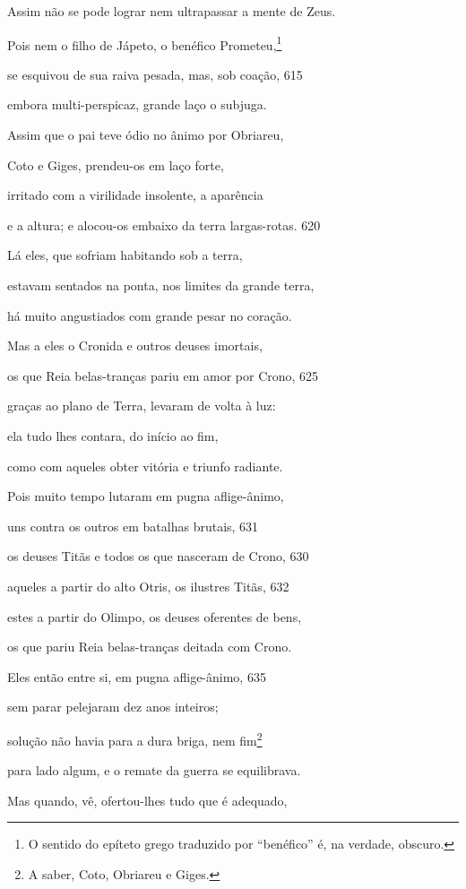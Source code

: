 \quad{}Assim não se pode lograr nem ultrapassar a mente de Zeus.

Pois nem o filho de Jápeto, o benéfico Prometeu,\footnote{O sentido do epíteto grego traduzido por ``benéfico'' é, na verdade, obscuro.}

se esquivou de sua raiva pesada, mas, sob coação, \num{615}

embora multi-perspicaz, grande laço o subjuga.

\medskip

Assim que o pai teve ódio no ânimo por Obriareu,

Coto e Giges, prendeu-os em laço forte,

irritado com a virilidade insolente, a aparência

e a altura; e alocou-os embaixo da terra largas-rotas. \num{620}

Lá eles, que sofriam habitando sob a terra,

estavam sentados na ponta, nos limites da grande terra,

há muito angustiados com grande pesar no coração.

Mas a eles o Cronida e outros deuses imortais,

os que Reia belas-tranças pariu em amor por Crono, \num{625}

graças ao plano de Terra, levaram de volta à luz:

ela tudo lhes contara, do início ao fim,

como com aqueles obter vitória e triunfo radiante.

Pois muito tempo lutaram em pugna aflige-ânimo,

uns contra os outros em batalhas brutais, \num{631}

os deuses Titãs e todos os que nasceram de Crono, \num{630}

aqueles a partir do alto Otris, os ilustres Titãs, \num{632}

estes a partir do Olimpo, os deuses oferentes de bens,

os que pariu Reia belas-tranças deitada com Crono.

Eles então entre si, em pugna aflige-ânimo, \num{635}

sem parar pelejaram dez anos inteiros;

solução não havia para a dura briga, nem fim\footnote{A saber, Coto, Obriareu e Giges.}

para lado algum, e o remate da guerra se equilibrava.

\quad{}Mas quando, vê, ofertou-lhes tudo que é adequado,

